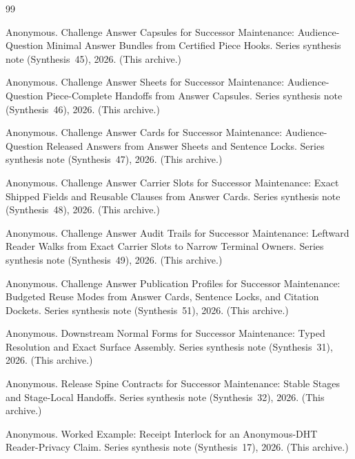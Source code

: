 \documentclass[11pt]{article}
\begin{document}
\begin{thebibliography}{99}\small

Anonymous.
\newblock Challenge Answer Capsules for Successor Maintenance: Audience-Question Minimal Answer Bundles from Certified Piece Hooks.
\newblock Series synthesis note (Synthesis~45), 2026. (This archive.)

Anonymous.
\newblock Challenge Answer Sheets for Successor Maintenance: Audience-Question Piece-Complete Handoffs from Answer Capsules.
\newblock Series synthesis note (Synthesis~46), 2026. (This archive.)

Anonymous.
\newblock Challenge Answer Cards for Successor Maintenance: Audience-Question Released Answers from Answer Sheets and Sentence Locks.
\newblock Series synthesis note (Synthesis~47), 2026. (This archive.)

Anonymous.
\newblock Challenge Answer Carrier Slots for Successor Maintenance: Exact Shipped Fields and Reusable Clauses from Answer Cards.
\newblock Series synthesis note (Synthesis~48), 2026. (This archive.)

Anonymous.
\newblock Challenge Answer Audit Trails for Successor Maintenance: Leftward Reader Walks from Exact Carrier Slots to Narrow Terminal Owners.
\newblock Series synthesis note (Synthesis~49), 2026. (This archive.)

Anonymous.
\newblock Challenge Answer Publication Profiles for Successor Maintenance: Budgeted Reuse Modes from Answer Cards, Sentence Locks, and Citation Dockets.
\newblock Series synthesis note (Synthesis~51), 2026. (This archive.)

Anonymous.
\newblock Downstream Normal Forms for Successor Maintenance: Typed Resolution and Exact Surface Assembly.
\newblock Series synthesis note (Synthesis~31), 2026. (This archive.)

Anonymous.
\newblock Release Spine Contracts for Successor Maintenance: Stable Stages and Stage-Local Handoffs.
\newblock Series synthesis note (Synthesis~32), 2026. (This archive.)

Anonymous.
\newblock Worked Example: Receipt Interlock for an Anonymous-DHT Reader-Privacy Claim.
\newblock Series synthesis note (Synthesis~17), 2026. (This archive.)



\end{thebibliography}
\end{document}
